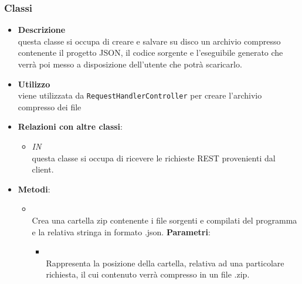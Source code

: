 \subsubsection{Classi}
\label{\nogloxy{swedesigner::server::utility::Compressor}}
\begin{figure}[h]
\centering
{}
\caption{}
\end{figure}
\FloatBarrier
\begin{itemize}
\item \textbf{Descrizione}\\
questa classe si occupa di creare e salvare su disco un archivio compresso contenente il progetto JSON, il codice sorgente e l'eseguibile generato che verrà poi messo a disposizione dell'utente che potrà scaricarlo.
\item \textbf{Utilizzo}\\
viene utilizzata da \texttt{RequestHandlerController} per creare l'archivio compresso dei file
\item \textbf{Relazioni con altre classi}:
\begin{itemize}
\item \textit{IN} \hyperref[\nogloxy{swedesigner::server::controller::RequestHandlerController}]{}\\
questa classe si occupa di ricevere le richieste REST provenienti dal client.
\end{itemize}
\item \textbf{Metodi}:
\begin{itemize}
\item {}
\\ Crea una cartella zip contenente i file sorgenti e compilati del programma e la relativa stringa in formato .json.
\textbf{Parametri}:
\begin{itemize}
\item {}
\\ Rappresenta la posizione della cartella, relativa ad una particolare richiesta, il cui contenuto verrà compresso in un file .zip.
\end{itemize}
\end{itemize}
\end{itemize}
